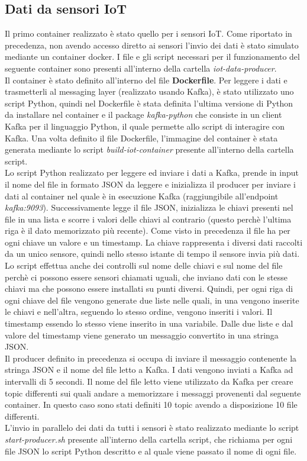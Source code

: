 \documentclass{article}
\begin{document}
\subsection{Dati da sensori IoT}
Il primo container realizzato è stato quello per i sensori IoT. Come riportato in precedenza, non avendo accesso diretto ai sensori l'invio dei dati è stato simulato mediante un container docker. I file e gli script necessari per il funzionamento del seguente container sono presenti all'interno della cartella \textit{iot-data-producer}.\\
Il container è stato definito all'interno del file \textbf{Dockerfile}. Per leggere i dati e trasmetterli al messaging layer (realizzato usando Kafka), è stato utilizzato uno script Python, quindi nel Dockerfile è stata definita l'ultima versione di Python da installare nel container e il package \textit{kafka-python} che consiste in un client Kafka per il linguaggio Python, il quale permette allo script di interagire con Kafka.
Una volta definito il file Dockerfile, l'immagine del container è stata generata mediante lo script \textit{build-iot-container} presente all'interno della cartella script.\\
Lo script Python realizzato per leggere ed inviare i dati a Kafka, prende in input il nome del file in formato JSON da leggere e inizializza il producer per inviare i dati al container nel quale è in esecuzione Kafka (raggiungibile all'endpoint \textit{kafka:9093}). Successivamente legge il file JSON, inizializza le chiavi presenti nel file in una lista e scorre i valori delle chiavi al contrario (questo perchè l'ultima riga è il dato memorizzato più recente). Come visto in precedenza il file ha per ogni chiave un valore e un timestamp. La chiave rappresenta i diversi dati raccolti da un unico sensore, quindi nello stesso istante di tempo il sensore invia più dati. Lo script effettua anche dei controlli sul nome delle chiavi e sul nome del file perchè ci possono essere sensori chiamati uguali, che inviano dati con le stesse chiavi ma che possono essere installati su punti diversi. Quindi, per ogni riga di ogni chiave del file vengono generate due liste nelle quali, in una vengono inserite le chiavi e nell'altra, seguendo lo stesso ordine, vengono inseriti i valori. Il timestamp essendo lo stesso viene inserito in una variabile. Dalle due liste e dal valore del timestamp viene generato un messaggio convertito in una stringa JSON. \\
Il producer definito in precedenza si occupa di inviare il messaggio contenente la stringa JSON e il nome del file letto a Kafka. I dati vengono inviati a Kafka ad intervalli di 5 secondi. Il nome del file letto viene utilizzato da Kafka per creare topic differenti sui quali andare a memorizzare i messaggi provenenti dal seguente container. In questo caso sono stati definiti 10 topic avendo a disposizione 10 file differenti.\\
L'invio in parallelo dei dati da tutti i sensori è stato realizzato mediante lo script \textit{start-producer.sh} presente all'interno della cartella script, che richiama per ogni file JSON lo script Python descritto e al quale viene passato il nome di ogni file. 
\end{document}
